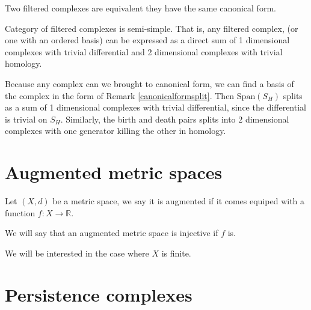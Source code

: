 \begin{corollary}
Two filtered complexes are equivalent
\ifff they have the same canonical form.
\end{corollary}


\begin{corollary}{Category of filtered complexes is semi-simple.}
That is, any filtered complex, (or one with an ordered basis) can be expressed as a direct sum of 
1 dimensional complexes with trivial differential and 2 dimensional complexes with trivial homology.
\end{corollary}

\begin{prof}
Because any complex can we brought to canonical form, we can find a basis of the complex in the form of Remark \ref{canonicalformsplit}.
Then $\text{Span}(S_H)$ splits as a sum of 1 dimensional complexes with trivial differential, since the differential is trivial on $S_H$.
Similarly, the birth and death pairs splits into 2 dimensional complexes with one generator killing the other in homology.

\end{prof}

\section{Augmented metric spaces}

\begin{definition}
Let $(X,d)$ be a metric space,
we say it is augmented if it comes equiped with a function 
$f:X\to\mathbb{R}$.

\end{definition}

We will say that an augmented metric space is injective if $f$ is.

We will be interested in the case where $X$ is finite.

\section{Persistence complexes}

